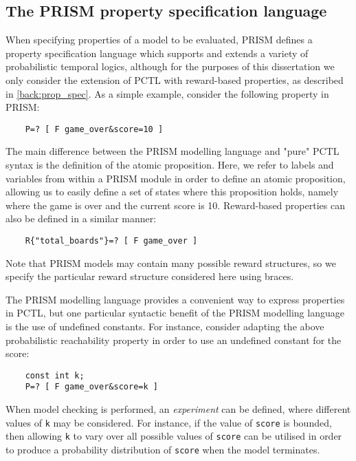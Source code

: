 \subsection{The PRISM property specification language}
\label{back:PRISM-prop}

When specifying properties of a model to be evaluated, PRISM defines a property specification language which supports and extends a variety of probabilistic temporal logics, although for the purposes of this dissertation we only consider the extension of PCTL with reward-based properties, as described in \ref{back:prop_spec}. As a simple example, consider the following property in PRISM:

\begin{verbatim}
    P=? [ F game_over&score=10 ]
\end{verbatim}

The main difference between the PRISM modelling language and "pure" PCTL syntax is the definition of the atomic proposition. Here, we refer to labels and variables from within a PRISM module in order to define an atomic proposition, allowing us to easily define a set of states where this proposition holds, namely where the game is over and the current score is 10. Reward-based properties can also be defined in a similar manner:

\begin{verbatim}
    R{"total_boards"}=? [ F game_over ]
\end{verbatim}

Note that PRISM models may contain many possible reward structures, so we specify the particular reward structure considered here using braces.

The PRISM modelling language provides a convenient way to express properties in PCTL, but one particular syntactic benefit of the PRISM modelling language is the use of undefined constants. For instance, consider adapting the above probabilistic reachability property in order to use an undefined constant for the score:

\begin{verbatim}
    const int k;
    P=? [ F game_over&score=k ]
\end{verbatim}

When model checking is performed, an \emph{experiment} can be defined, where different values of \verb+k+ may be considered. For instance, if the value of \verb+score+ is bounded, then allowing \verb+k+ to vary over all possible values of \verb+score+ can be utilised in order to produce a probability distribution of \verb+score+ when the model terminates.

